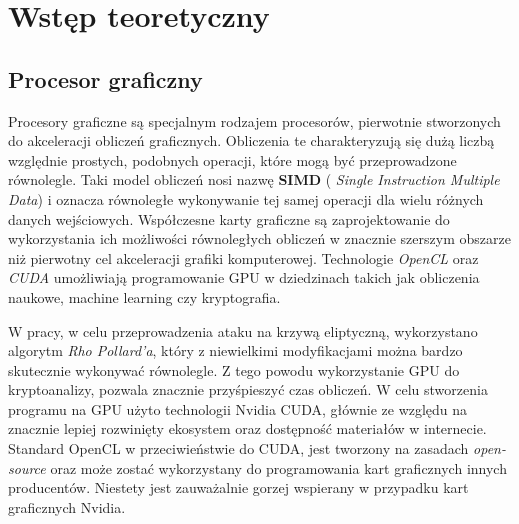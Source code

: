 \newpage
\section{Wstęp teoretyczny}

\subsection{Procesor graficzny}
Procesory graficzne są specjalnym rodzajem procesorów,
pierwotnie stworzonych do akceleracji obliczeń graficznych.
Obliczenia te charakteryzują się dużą liczbą względnie prostych, podobnych operacji,
które mogą być przeprowadzone równolegle.
Taki model obliczeń nosi nazwę \textbf{SIMD} ( \textit{Single Instruction Multiple Data})
i oznacza równoległe wykonywanie tej samej operacji dla wielu różnych danych wejściowych.
Współczesne karty graficzne są zaprojektowanie do wykorzystania
ich możliwości równoległych obliczeń w znacznie szerszym obszarze niż
pierwotny cel akceleracji grafiki komputerowej.
Technologie \textit{OpenCL} oraz \textit{CUDA} umożliwiają
programowanie GPU w
dziedzinach takich jak obliczenia naukowe, machine learning czy kryptografia.

\par
W pracy, w celu przeprowadzenia ataku na krzywą eliptyczną, wykorzystano
algorytm \textit{Rho Pollard'a}, który z niewielkimi modyfikacjami można bardzo skutecznie wykonywać
równolegle. Z tego powodu wykorzystanie GPU do kryptoanalizy, pozwala znacznie przyśpieszyć czas
obliczeń. W celu stworzenia programu na GPU użyto technologii Nvidia CUDA, głównie ze względu
na znacznie lepiej rozwinięty ekosystem oraz dostępność materiałów w internecie.
Standard OpenCL w przeciwieństwie do CUDA, jest tworzony na zasadach \textit{open-source} oraz może zostać
wykorzystany do programowania kart graficznych innych producentów. Niestety jest zauważalnie
gorzej wspierany w przypadku kart graficznych Nvidia.
\par
